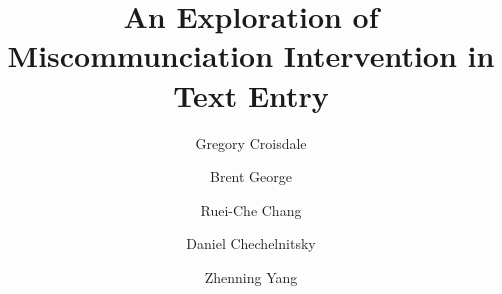 \documentclass[acmsmall,screen,authorversion,nonacm]{acmart}
\begin{document}
\title{An Exploration of Miscommunciation Intervention in Text Entry}

\author{Gregory Croisdale}
\author{Brent George}
\authornotemark[1]
\author{Ruei-Che Chang}
\authornotemark[1]
\author{Daniel Chechelnitsky}
\authornotemark[1]
\author{Zhenning Yang}
\authornotemark[1]

\renewcommand{\shortauthors}{G. Croisdale, B. George, R. Chang, D. Chechelnitsky, and Z. Yang}
\end{document}
